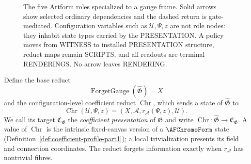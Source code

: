 \begin{figure}[htbp]
\centering
{}
\caption{The five Artform roles specialized to a gauge frame.  Solid arrows
show selected ordinary dependencies and the dashed return is gate-mediated.
Configuration variables such as $\mathcal U,\Psi,z$ are not role nodes: they
inhabit state types carried by the PRESENTATION.  A policy moves from
WITNESS to installed PRESENTATION structure, reduct maps remain SCRIPTS, and
all readouts are terminal RENDERINGS.  No arrow leaves RENDERING.}
\label{fig:gauge-five-roles}
\end{figure}

Define the base reduct
\[
 \operatorname{ForgetGauge}(\widehat{\mathfrak G})=X
\]
and the configuration-level coefficient reduct $\operatorname{Chr}$, which
sends a state of $\widehat{\mathfrak G}$ to
\[
 \operatorname{Chr}(\mathcal U,\Psi,z)=
 (X,\mathcal A,r_{\mathcal A}(\Psi,z),\mathcal U).
\]
We call its target $\mathfrak C_{\mathfrak G}$ the \emph{coefficient
presentation} of $\mathfrak G$ and write
$\operatorname{Chr}:\widehat{\mathfrak G}\to\mathfrak C_{\mathfrak G}$.  A
value of $\operatorname{Chr}$ is the intrinsic fixed-canvas version of a
$\AFChromoForm$ state (Definition~\ref{def:coefficient-profile-part1}); a
local trivialization presents its field and connection coordinates.  The
reduct forgets information exactly when $r_{\mathcal A}$ has nontrivial
fibres.

